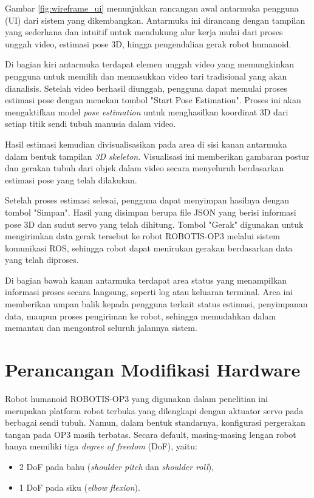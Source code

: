 Gambar \ref{fig:wireframe_ui} menunjukkan rancangan awal antarmuka pengguna (UI) dari sistem yang dikembangkan. Antarmuka ini dirancang dengan tampilan yang sederhana dan intuitif untuk mendukung alur kerja mulai dari proses unggah video, estimasi pose 3D, hingga pengendalian gerak robot humanoid.

Di bagian kiri antarmuka terdapat elemen unggah video yang memungkinkan pengguna untuk memilih dan memasukkan video tari tradisional yang akan dianalisis. Setelah video berhasil diunggah, pengguna dapat memulai proses estimasi pose dengan menekan tombol "Start Pose Estimation". Proses ini akan mengaktifkan model \textit{pose estimation} untuk menghasilkan koordinat 3D dari setiap titik sendi tubuh manusia dalam video.

Hasil estimasi kemudian divisualisasikan pada area di sisi kanan antarmuka dalam bentuk tampilan \textit{3D skeleton}. Visualisasi ini memberikan gambaran postur dan gerakan tubuh dari objek dalam video secara menyeluruh berdasarkan estimasi pose yang telah dilakukan.

Setelah proses estimasi selesai, pengguna dapat menyimpan hasilnya dengan tombol "Simpan". Hasil yang disimpan berupa file JSON yang berisi informasi pose 3D dan sudut servo yang telah dihitung. Tombol "Gerak" digunakan untuk mengirimkan data gerak tersebut ke robot ROBOTIS-OP3 melalui sistem komunikasi ROS, sehingga robot dapat menirukan gerakan berdasarkan data yang telah diproses.

Di bagian bawah kanan antarmuka terdapat area status yang menampilkan informasi proses secara langsung, seperti log atau keluaran terminal. Area ini memberikan umpan balik kepada pengguna terkait status estimasi, penyimpanan data, maupun proses pengiriman ke robot, sehingga memudahkan dalam memantau dan mengontrol seluruh jalannya sistem.

\section{Perancangan Modifikasi Hardware}

Robot humanoid ROBOTIS-OP3 yang digunakan dalam penelitian ini merupakan platform robot terbuka yang dilengkapi dengan aktuator servo pada berbagai sendi tubuh. Namun, dalam bentuk standarnya, konfigurasi pergerakan tangan pada OP3 masih terbatas. Secara default, masing-masing lengan robot hanya memiliki tiga \textit{degree of freedom} (DoF), yaitu:
\begin{itemize}
    \item 2 DoF pada bahu (\textit{shoulder pitch} dan \textit{shoulder roll}),
    \item 1 DoF pada siku (\textit{elbow flexion}).
\end{itemize}


